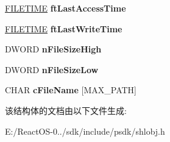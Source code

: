 \begin{DoxyCompactItemize}
\hyperlink{struct___f_i_l_e_t_i_m_e}{F\+I\+L\+E\+T\+I\+ME} {\bfseries ft\+Last\+Access\+Time}
\item 
\mbox{\label{struct___f_i_l_e_d_e_s_c_r_i_p_t_o_r_a_aba28f0697bf069463782d8e792121cfb}} 
\hyperlink{struct___f_i_l_e_t_i_m_e}{F\+I\+L\+E\+T\+I\+ME} {\bfseries ft\+Last\+Write\+Time}
\item 
\mbox{\label{struct___f_i_l_e_d_e_s_c_r_i_p_t_o_r_a_a881835cffa2c2b2e399938e6a3ae14db}} 
D\+W\+O\+RD {\bfseries n\+File\+Size\+High}
\item 
\mbox{\label{struct___f_i_l_e_d_e_s_c_r_i_p_t_o_r_a_a6ac98a7d154f0ecd999e89c8e548c947}} 
D\+W\+O\+RD {\bfseries n\+File\+Size\+Low}
\item 
\mbox{\label{struct___f_i_l_e_d_e_s_c_r_i_p_t_o_r_a_aaf925f07c286980d0c83cf564c8d14df}} 
C\+H\+AR {\bfseries c\+File\+Name} \mbox{[}M\+A\+X\+\_\+\+P\+A\+TH\mbox{]}
\end{DoxyCompactItemize}


该结构体的文档由以下文件生成\+:\begin{DoxyCompactItemize}
\item 
E\+:/\+React\+O\+S-\/0../sdk/include/psdk/shlobj.\+h\end{DoxyCompactItemize}
